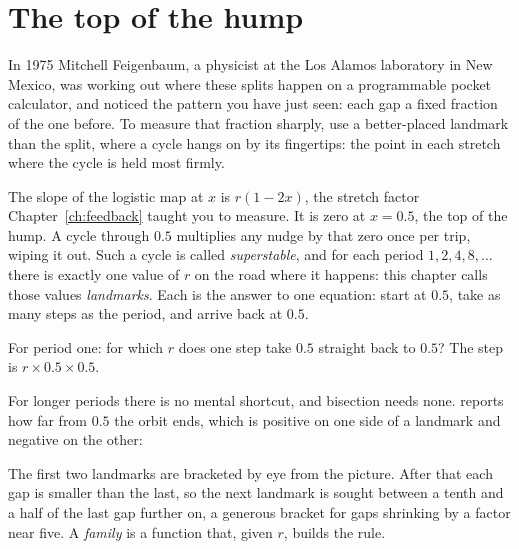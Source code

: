 \section{The top of the hump}
\label{sec:ch08-superstable}

\noindent
In 1975 Mitchell Feigenbaum, a physicist at the Los Alamos laboratory in New
Mexico, was working out where these splits happen on a programmable pocket
calculator, and noticed the pattern you have just seen: each gap a fixed
fraction of the one before. To measure that fraction sharply, use a
better-placed landmark than the split, where a cycle hangs on by its
fingertips: the point in each stretch where the cycle is held most firmly.

The slope of the logistic map at $x$ is $r(1 - 2x)$, the stretch factor
Chapter~\ref{ch:feedback} taught you to measure. It is zero at
$x = \num{0.5}$, the top of the hump. A cycle through $\num{0.5}$ multiplies
any nudge by that zero once per trip, wiping it out. Such a cycle is called
\emph{superstable}, and for each period $1, 2, 4, 8, \ldots$ there is exactly
one value of $r$ on the road where it happens: this chapter calls those
values \emph{landmarks}. Each is the answer to one equation: start at
$\num{0.5}$, take as many steps as the period, and arrive back at $\num{0.5}$.

\begin{think}
For period one: for which $r$ does one step take $\num{0.5}$ straight back to
$\num{0.5}$? The step is $r \times \num{0.5} \times \num{0.5}$.
\end{think}
For longer periods there is no mental shortcut, and bisection needs none.
 reports how far from $\num{0.5}$ the orbit ends, which is
positive on one side of a landmark and negative on the other:


\noindent
The first two landmarks are bracketed by eye from the picture. After that
each gap is smaller than the last, so the next landmark is sought between a
tenth and a half of the last gap further on, a generous bracket for gaps
shrinking by a factor near five. A \emph{family} is a function that, given
$r$, builds the rule.


